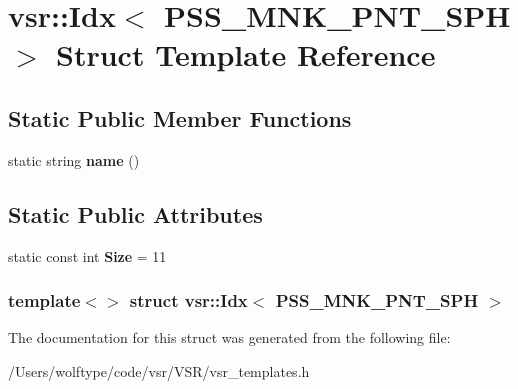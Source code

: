 \hypertarget{structvsr_1_1_idx_3_01_p_s_s___m_n_k___p_n_t___s_p_h_01_4}{\section{vsr\-:\-:Idx$<$ P\-S\-S\-\_\-\-M\-N\-K\-\_\-\-P\-N\-T\-\_\-\-S\-P\-H $>$ Struct Template Reference}
\label{structvsr_1_1_idx_3_01_p_s_s___m_n_k___p_n_t___s_p_h_01_4}
}
\subsection*{Static Public Member Functions}
\begin{DoxyCompactItemize}
\item 
\hypertarget{structvsr_1_1_idx_3_01_p_s_s___m_n_k___p_n_t___s_p_h_01_4_a7ebfadd7aa83449bc471bcfc16137b92}{static string {\bfseries name} ()}\label{structvsr_1_1_idx_3_01_p_s_s___m_n_k___p_n_t___s_p_h_01_4_a7ebfadd7aa83449bc471bcfc16137b92}

\end{DoxyCompactItemize}
\subsection*{Static Public Attributes}
\begin{DoxyCompactItemize}
\item 
\hypertarget{structvsr_1_1_idx_3_01_p_s_s___m_n_k___p_n_t___s_p_h_01_4_a2fc497c2c59eba65fe831a440284f9ac}{static const int {\bfseries Size} = 11}\label{structvsr_1_1_idx_3_01_p_s_s___m_n_k___p_n_t___s_p_h_01_4_a2fc497c2c59eba65fe831a440284f9ac}

\end{DoxyCompactItemize}
\subsubsection*{template$<$$>$ struct vsr\-::\-Idx$<$ P\-S\-S\-\_\-\-M\-N\-K\-\_\-\-P\-N\-T\-\_\-\-S\-P\-H $>$}



The documentation for this struct was generated from the following file\-:\begin{DoxyCompactItemize}
\item 
/\-Users/wolftype/code/vsr/\-V\-S\-R/vsr\-\_\-templates.\-h\end{DoxyCompactItemize}
